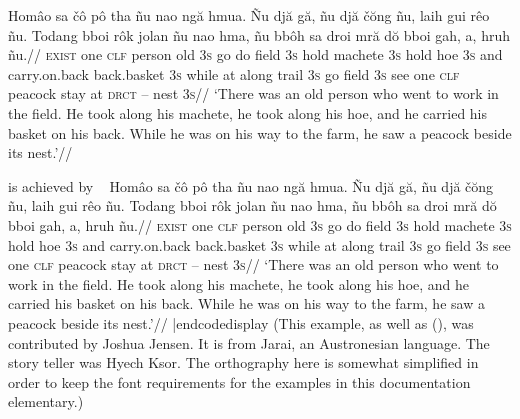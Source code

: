 
\framedisplay
\ex[glftpos=right,glhangstyle=none]
\let\\=\textsc
\begingl
\gla
Hom\^{a}o sa \v{c}\^{o} p\^{o} tha  \~{n}u nao ng\u{a} hmua. \~{N}u
dj\u{a} g\u{a}, \~{n}u dj\u{a} \v{c}\u{o}ng \~{n}u, laih gui r\^{e}o
\~{n}u. Todang bboi r\^{o}k jolan \~{n}u nao hma, \~{n}u bb\^{o}h sa
droi mr\u{a} d\u{o} bboi gah, a, hruh \~{n}u.//
\glb
\\{exist} one \\{clf} person old \\{3s} go do field \\{3s} hold
machete \\{3s} hold hoe \\{3s} and carry.on.back back.basket \\{3s}
while at along trail \\{3s} go field \\{3s} see one \\{clf} peacock
stay at \\{drct} -- nest \\{3s}//
\glft
`There was an old person who went to work in the field. He took
along his machete, he took along his hoe, and he carried his
basket on his back. While he was on his way to the farm, he saw a
peacock beside its nest.'//
\endgl
\xe
\endframedisplay

\noindent is achieved by
\codedisplay~
\ex[glftpos=right,glhangstyle=none]
\let\\=\textsc
\begingl
\gla
Hom\^{a}o sa \v{c}\^{o} p\^{o} tha  \~{n}u nao ng\u{a} hmua. \~{N}u
dj\u{a} g\u{a}, \~{n}u dj\u{a} \v{c}\u{o}ng \~{n}u, laih gui r\^{e}o
\~{n}u. Todang bboi r\^{o}k jolan \~{n}u nao hma, \~{n}u bb\^{o}h sa
droi mr\u{a} d\u{o} bboi gah, a, hruh \~{n}u.//
\glb
\\{exist} one \\{clf} person old \\{3s} go do field \\{3s} hold
machete \\{3s} hold hoe \\{3s} and carry.on.back back.basket \\{3s}
while at along trail \\{3s} go field \\{3s} see one \\{clf} peacock
stay at \\{drct} -- nest \\{3s}//
\glft
`There was an old person who went to work in the field. He took
along his machete, he took along his hoe, and he carried his
basket on his back. While he was on his way to the farm, he saw a
peacock beside its nest.'//
\endgl
\xe
|endcodedisplay
(This example, as well as (), was contributed by
Joshua Jensen.  It is from Jarai, an Austronesian language.  The
story teller was Hyech Ksor.  The orthography here is somewhat
simplified in order to keep the font requirements for the
examples in this documentation elementary.)

